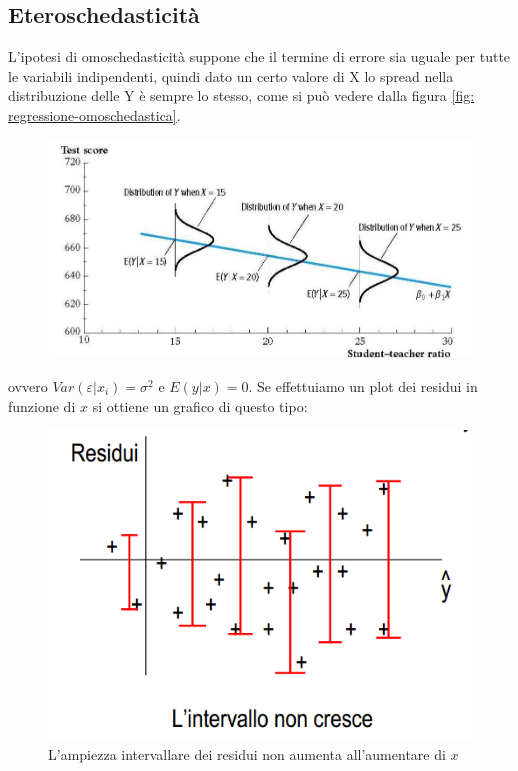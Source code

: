 \documentclass[]{article}
\begin{document}
\subsection{Eteroschedasticità}
L'ipotesi di omoschedasticità suppone che il termine di errore sia uguale per tutte le variabili indipendenti, quindi dato un certo valore di X lo spread nella distribuzione delle Y è sempre lo stesso, come si può vedere dalla figura \ref{fig: regressione-omoschedastica}.
\begin{figure}
	\includegraphics[scale = 0.5]{Immagini/regressione-omoschedastica.png}
\end{figure}
ovvero $Var(\varepsilon \vert x_i) = \sigma^2$ e $E(y \vert x) = 0$. Se effettuiamo un plot dei residui in funzione di $x$ si ottiene un grafico di questo tipo:
\begin{figure}[H]
	\centering
	\includegraphics[scale = 0.5]{Immagini/residui-omoschedastici.png}
	\caption{L'ampiezza intervallare dei residui non aumenta all'aumentare di $x$}
\end{figure}
\end{document}
